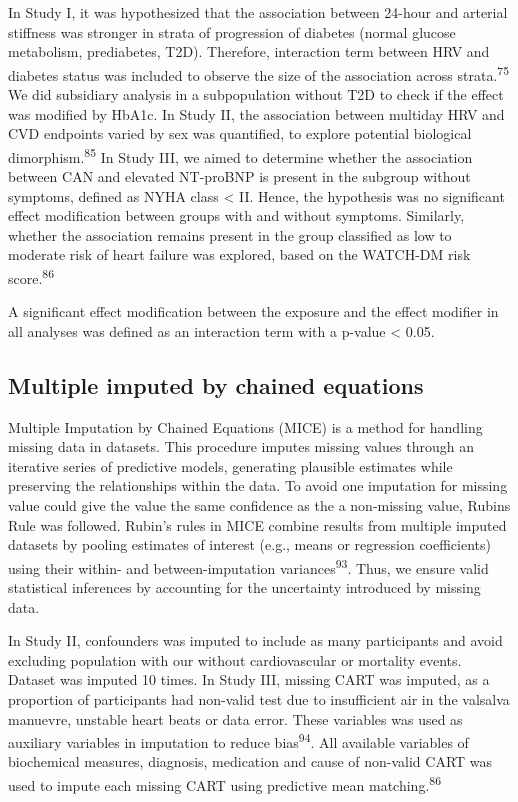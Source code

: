 \documentclass[
  letterpaper,
  headsepline=true,
  open=any]{scrbook}
\begin{document}
In Study I, it was hypothesized that the association between 24-hour and
arterial stiffness was stronger in strata of progression of diabetes
(normal glucose metabolism, prediabetes, T2D). Therefore, interaction
term between HRV and diabetes status was included to observe the size of
the association across strata.\textsuperscript{75} We did subsidiary
analysis in a subpopulation without T2D to check if the effect was
modified by HbA1c. In Study II, the association between multiday HRV and
CVD endpoints varied by sex was quantified, to explore potential
biological dimorphism.\textsuperscript{85} In Study III, we aimed to
determine whether the association between CAN and elevated NT-proBNP is
present in the subgroup without symptoms, defined as NYHA class
\textless{} II. Hence, the hypothesis was no significant effect
modification between groups with and without symptoms. Similarly,
whether the association remains present in the group classified as low
to moderate risk of heart failure was explored, based on the WATCH-DM
risk score.\textsuperscript{86}

A significant effect modification between the exposure and the effect
modifier in all analyses was defined as an interaction term with a
p-value \textless{} 0.05.

\hypertarget{multiple-imputed-by-chained-equations}{%
\subsection{Multiple imputed by chained
equations}\label{multiple-imputed-by-chained-equations}}

Multiple Imputation by Chained Equations (MICE) is a method for handling
missing data in datasets. This procedure imputes missing values through
an iterative series of predictive models, generating plausible estimates
while preserving the relationships within the data. To avoid one
imputation for missing value could give the value the same confidence as
the a non-missing value, Rubins Rule was followed. Rubin's rules in MICE
combine results from multiple imputed datasets by pooling estimates of
interest (e.g., means or regression coefficients) using their within-
and between-imputation variances\textsuperscript{93}. Thus, we ensure
valid statistical inferences by accounting for the uncertainty
introduced by missing data.

In Study II, confounders was imputed to include as many participants and
avoid excluding population with our without cardiovascular or mortality
events. Dataset was imputed 10 times. In Study III, missing CART was
imputed, as a proportion of participants had non-valid test due to
insufficient air in the valsalva manuevre, unstable heart beats or data
error. These variables was used as auxiliary variables in imputation to
reduce bias\textsuperscript{94}. All available variables of biochemical
measures, diagnosis, medication and cause of non-valid CART was used to
impute each missing CART using predictive mean
matching.\textsuperscript{86}
\end{document}
